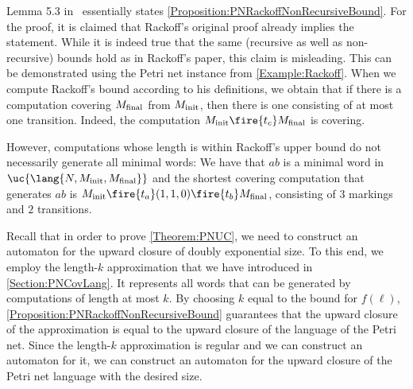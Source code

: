\documentclass[../../diss.tex]{subfiles}
\begin{document}
\begin{remark}
    Lemma 5.3 in~\cite{Leroux13} essentially states \cref{Proposition:PNRackoffNonRecursiveBound}.
    For the proof, it is claimed that Rackoff's original proof already implies the statement.
    While it is indeed true that the same (recursive as well as non-recursive) bounds hold as in Rackoff's paper, this claim is misleading.
    This can be demonstrated using the Petri net instance from \cref{Example:Rackoff}.
    When we compute Rackoff's bound according to his definitions, we obtain that if there is a computation covering $M_{\text{final}}$ from $M_{\text{init}}$, then there is one consisting of at most one transition.
    Indeed, the computation $\Minit \fire{\rta} \Mfinal$ is covering.

    However, computations whose length is within Rackoff's upper bound do not necessarily generate all minimal words:
    We have that $ab$ is a minimal word in $\uc{\lang{N,\Minit,\Mfinal}}$ and the shortest covering computation that generates $ab$ is $\Minit \fire{\rthelp} (1,1,0) \fire{\rtb} \Mfinal$, consisting of $3$ markings and $2$ transitions.
\end{remark}


Recall that in order to prove \cref{Theorem:PNUC}, we need to construct an automaton for the upward closure of doubly exponential size.
To this end, we employ the length-$k$ approximation that we have introduced in \cref{Section:PNCovLang}.
It represents all words that can be generated by computations of length at most $k$.
By choosing $k$ equal to the bound for $f(\ell)$, \cref{Proposition:PNRackoffNonRecursiveBound} guarantees that the upward closure of the approximation is equal to the upward closure of the language of the Petri net.
Since the length-$k$ approximation is regular and we can construct an automaton for it, we can construct an automaton for the upward closure of the Petri net language with the desired size.
\end{document}
